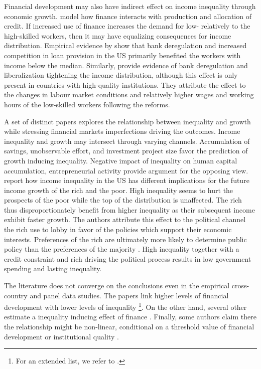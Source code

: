 \documentclass[preprint, nonatbib, 10pt]{elsarticle}
\begin{document}
Financial development may also have indirect effect on income inequality through economic growth. \textcite{townsendeueda2006} model how finance interacts with production and allocation of credit. If increased use of finance increases the demand for low- relatively to the high-skilled workers, then it may have equalizing consequences for income distribution. Empirical evidence by \textcite{beck2010big} show that bank deregulation and increased competition in loan provision in the \ac{US} primarily benefited the workers with income below the median. Similarly, \textcite{delis2014} provide evidence of bank deregulation and liberalization tightening the income distribution, although this effect is only present in countries with high-quality institutions. They attribute the effect to the changes in labour market conditions and relatively higher wages and working hours of the low-skilled workers following the reforms. 

A set of distinct papers explores the relationship between inequality and growth while stressing financial markets imperfections driving the outcomes. Income inequality and growth may intersect through varying channels. Accumulation of savings, unobservable effort, and investment project size favor the prediction of growth inducing inequality. Negative impact of inequality on human capital accumulation, entrepreneurial activity provide argument for the opposing view. 
\textcite{milanovicvan2018inequality} report how income inequality in the \ac{US} has different implications for the future income growth of the rich and the poor. High inequality seems to hurt the prospects of the poor while the top of the distribution is unaffected. The rich thus disproportionately benefit from higher inequality as their subsequent income exhibit faster growth. The authors attribute this effect to the political channel the rich use to lobby in favor of the policies which support their economic interests. Preferences of the rich are ultimately more likely to determine public policy than the preferences of the majority \parencite{gilens_page_2014}. High inequality together with a credit constraint and rich driving the political process results in low government spending and lasting inequality.

The literature does not converge on the conclusions even in the empirical cross-country and panel data studies. The papers link higher levels of financial development with lower levels of inequality \parencite{beck2007finance, hamori2012, gimet2011closer, kunieda2014finance}\footnote{For an extended list, we refer to \textcite{de2017finance}.}. On the other hand, several other estimate a inequality inducing effect of finance \parencite{Jaumotte2013, jauch2016financial, de2017finance}. Finally, some authors claim there the relationship might be non-linear, conditional on a threshold value of financial development \parencite{kim2011nonlinearity,tan2012nonlinear} or institutional quality \parencite{LawSingh2014, delis2014}.
\end{document}
